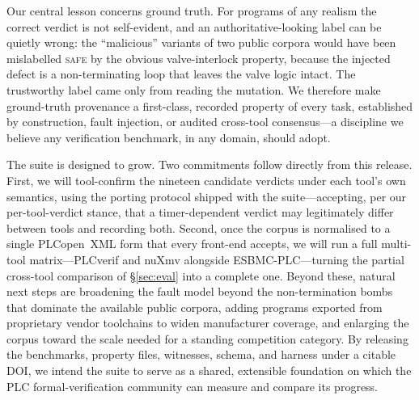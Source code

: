 Our central lesson concerns ground truth. For programs of any realism the correct verdict is not
self-evident, and an authoritative-looking label can be quietly wrong: the ``malicious'' variants
of two public corpora would have been mislabelled \textsc{safe} by the obvious valve-interlock
property, because the injected defect is a non-terminating loop that leaves the valve logic
intact. The trustworthy label came only from reading the mutation. We therefore make ground-truth
provenance a first-class, recorded property of every task, established by construction, fault
injection, or audited cross-tool consensus---a discipline we believe any verification benchmark,
in any domain, should adopt.

The suite is designed to grow. Two commitments follow directly from this release. First, we will
tool-confirm the nineteen candidate verdicts under each tool's own semantics, using the porting
protocol shipped with the suite---accepting, per our per-tool-verdict stance, that a
timer-dependent verdict may legitimately differ between tools and recording both. Second, once the
corpus is normalised to a single PLCopen~XML form that every front-end accepts, we will run a full
multi-tool matrix---PLCverif and nuXmv alongside ESBMC-PLC---turning the partial cross-tool
comparison of \S\ref{sec:eval} into a complete one. Beyond these, natural next steps are broadening
the fault model beyond the non-termination bombs that dominate the available public corpora, adding
programs exported from proprietary vendor toolchains to widen manufacturer coverage, and enlarging
the corpus toward the scale needed for a standing competition category. By releasing the
benchmarks, property files,
witnesses, schema, and harness under a citable DOI, we intend the suite to serve as a shared,
extensible foundation on which the PLC formal-verification community can measure and compare its
progress.

